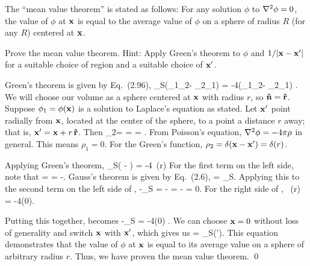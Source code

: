 \newcommand{\phiq}{\phi_1}
\newcommand{\phiw}{\phi_2}
\newcommand{\rhoq}{\rho_1}
\newcommand{\rhow}{\rho_2}
\newcommand{\intS}{\int_S}
\newcommand{\dS}{\dd{S}}
\newcommand{\vv}{\vec{v}}
\newcommand{\phixp}{\phi(\vx')}

\begin{statement}{}
	The ``mean value theorem'' is stated as follows: For any solution $\phi$ to $\nabla^2 \phi = 0$, the value of $\phi$ at $\mathbf{x}$ is equal to the average value of $\phi$ on a sphere of radius $R$ (for any $R$) centered at $\mathbf{x}$.
\end{statement}

\begin{problem} \label{5a}
	Prove the mean value theorem.  Hint: Apply Green's theorem to $\phi$ and $1/\abs{\mathbf{x} - \mathbf{x}'}$ for a suitable choice of region and a suitable choice of $\mathbf{x}'$.
\end{problem}

\begin{solution}
	Green's theorem is given by Eq.~(2.96),
	\beq
		\intS \nh \cdot (\phiq \nabla\phiw - \phiw \nabla\phiq) \dS = -4\pi \intV (\phiq \rhow - \phiw \rhoq) \dcx.
	\eeq
	We will choose our volume as a sphere centered at $\mathbf{x}$ with radius $r$, so $\mathbf{\hat{n}} = \mathbf{\hat{r}}$.  Suppose $\phiq = \phix$ is a solution to Laplace's equation as stated.  Let $\mathbf{x}'$ point radially from $\mathbf{x}$, located at the center of the sphere, to a point a distance $r$ away; that is, $\mathbf{x}' = \mathbf{x} + r \, \mathbf{\hat{r}}$.  Then
	\beq
		\phiw =  =  = .
	\eeq
	From Poisson's equation, $\nabla^2\phi = -4\pi\rho$ in general.  This means $\rhoq = 0$.  For the Green's function, $\rhow = \delta(\vx - \vx') = \delta(r)$.
	
	Applying Green's theorem,
	\beqn \label{gt}
		\intS \rh \cdot \left( \phix \nabla{} -  \nabla\phix \right) \dS = -4\pi \intV \phi \, \delta(r) \dcx
	\eeqn
	For the first term on the left side, note that
	\beq
		\rh \cdot \nabla{} =   \rh \cdot \rh = -.
	\eeq
	Gauss's theorem is given by Eq.~(2.6),
	\beq
		\intV \nabla \cdot \vv \dcx = \intS \vv \cdot \nh \dS.
	\eeq
	Applying this to the second term on the left side of ,
	\beq
		-\intS \nh \cdot {} \nabla\phix \dS = -\intV \nabla \cdot {} \nabla\phix \dcx
		= - \lap\phix
		= 0.
	\eeq
	For the right side of ,
	\pi \intV \phix \, \delta(r) \dcx = -4\pi \phi(0).
	\eeq
	
	Putting this together,  becomes
	\beq
		-\intS {} \dS = -4\pi \phi(0) \dS.
	\eeq
	We can choose $\mathbf{x} = 0$ without loss of generality and switch $\mathbf{x}$ with $\mathbf{x}'$, which gives us
	\beqn \label{mvt}
		\phix =  \intS \phixp {}.
	\eeqn
	This equation demonstrates that the value of $\phi$ at $\mathbf{x}$ is equal to its average value on a sphere of arbitrary radius $r$.  Thus, we have proven the mean value theorem. \qed
\end{solution}


